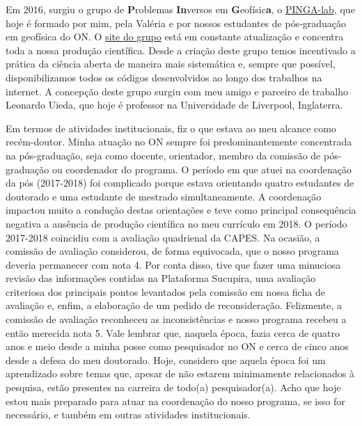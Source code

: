 \bigskip

\noindent Em 2016, surgiu o grupo de \textbf{P}roblemas \textbf{In}versos 
em \textbf{G}eofísic\textbf{a}, o \href{https://www.pinga-lab.org/}{PINGA-lab}, 
que hoje é formado por mim, pela Valéria e por nossos estudantes de 
pós-graduação em geofísica do ON. O \href{https://www.pinga-lab.org/}{site do grupo} 
está em constante atualização e concentra toda a nossa produção científica. 
Desde a criação deste grupo temos incentivado a prática da ciência aberta de maneira 
mais sistemática e, sempre que possível, disponibilizamos todos os códigos desenvolvidos 
ao longo dos trabalhos na internet. A concepção deste grupo surgiu com meu amigo e 
parceiro de trabalho Leonardo Uieda, que hoje é professor na Universidade de Liverpool,
Inglaterra.

\bigskip

\noindent Em termos de atividades institucionais, fiz o que estava ao meu alcance como recém-doutor.
Minha atuação no ON sempre foi predominantemente concentrada na pós-graduação, seja como
docente, orientador, membro da comissão de pós-graduação ou coordenador do programa.
O período em que atuei na coordenação da pós (2017-2018) foi complicado porque estava
orientando quatro estudantes de doutorado e uma estudante de mestrado simultaneamente. 
A coordenação impactou muito a condução destas orientações e teve como principal
consequência negativa a ausência de produção científica no meu currículo em 2018. 
O período 2017-2018 coincidiu com a avaliação quadrienal da CAPES.
Na ocasião, a comissão de avaliação considerou, de forma equivocada, que o nosso programa 
deveria permanecer com nota 4. Por conta disso, tive que fazer uma 
minuciosa revisão das informações contidas na Plataforma Sucupira, 
uma avaliação criteriosa dos principais pontos levantados pela comissão em nossa 
ficha de avaliação e, enfim, a elaboração de um pedido de reconsideração. 
Felizmente, a comissão de avaliação reconheceu as inconsistências e nosso programa 
recebeu a então merecida nota 5. Vale lembrar que, naquela época, fazia cerca de quatro anos 
e meio desde a minha posse como pesquisador no ON e cerca de cinco anos desde a defesa do 
meu doutorado. 
Hoje, considero que aquela época foi um aprendizado sobre temas que, apesar de não
estarem minimamente relacionados à pesquisa, estão presentes na carreira de todo(a)
pesquisador(a). Acho que hoje estou mais preparado para atuar na coordenação do nosso
programa, se isso for necessário, e também em outras atividades institucionais.
